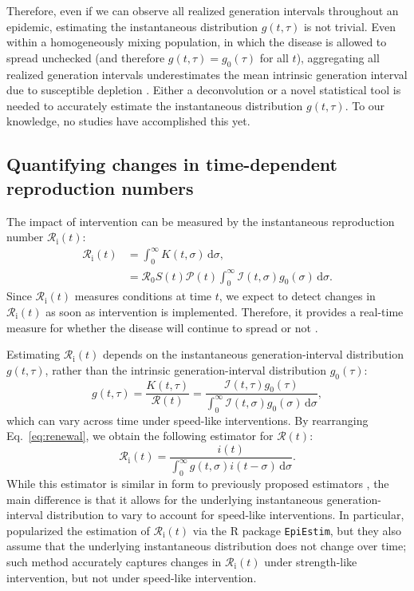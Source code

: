 \documentclass[12pt]{article}
\newcommand{\eref}[1]{Eq.~\ref{eq:#1}}
\newcommand{\Rx}[1]{\ensuremath{{\mathcal R}_{#1}}\xspace}
\newcommand{\Ri}{\Rx{\mathrm{i}}}
\newcommand{\RR}{\ensuremath{{\mathcal R}}\xspace}
\newcommand{\dd}[1]{\ensuremath{\, \mathrm{d}#1}}
\newcommand{\dsigma}{\dd{\sigma}}
\newcommand{\PP}{{\mathcal P}}
\newcommand{\II}{{\mathcal I}}
\begin{document}
Therefore, even if we can observe all realized generation intervals throughout an epidemic, estimating the instantaneous distribution $g(t, \tau)$ is not trivial.
Even within a homogeneously mixing population, in which the disease is allowed to spread unchecked (and therefore $g(t, \tau) = g_0(\tau)$ for all $t$), aggregating all realized generation intervals underestimates the mean intrinsic generation interval due to susceptible depletion \citep{park2020inferring}.
Either a deconvolution or a novel statistical tool is needed to accurately estimate the instantaneous distribution $g(t, \tau)$.
To our knowledge, no studies have accomplished this yet.

\subsection{Quantifying changes in time-dependent reproduction numbers}

The impact of intervention can be measured by the instantaneous reproduction number $\Ri(t)$:
\begin{align}
\Ri(t) &= \int_0^\infty K(t, \sigma) \dsigma, \\
&= \RR_0 S(t) \PP(t) \int_0^\infty \II(t,\sigma) g_0(\sigma) \dsigma.
\label{eq:rt}
\end{align}
Since $\Ri(t)$ measures conditions at time $t$, we expect to detect changes in $\Ri(t)$ as soon as intervention is implemented.
Therefore, it provides a real-time measure for whether the disease will continue to spread or not \citep{gostic2020practical}.

Estimating $\Ri(t)$ depends on the instantaneous generation-interval distribution $g(t, \tau)$, rather than the intrinsic generation-interval distribution $g_0(\tau)$:
\begin{equation}
g(t, \tau) = \frac{K(t, \tau)}{\RR(t)} = \frac{\II(t,\tau) g_0(\tau)}{\int_0^\infty \II(t,\sigma) g_0(\sigma) \dsigma},
\end{equation}
which can vary across time under speed-like interventions.
By rearranging \eref{renewal}, we obtain the following estimator for $\RR(t)$:
\begin{equation}
\Ri(t) = \frac{i(t)}{\int_0^\infty g(t, \sigma) i(t-\sigma) \dsigma}.
\end{equation}
While this estimator is similar in form to previously proposed estimators \citep{fraser2007estimating}, the main difference is that it allows for the underlying instantaneous generation-interval distribution to vary to account for speed-like interventions.
In particular, \cite{cori2013new} popularized the estimation of $\Ri(t)$ via the R package \texttt{EpiEstim}, but they also assume that the underlying instantaneous distribution does not change over time; 
such method accurately captures changes in $\Ri(t)$ under strength-like intervention, but not under speed-like intervention.
\end{document}
